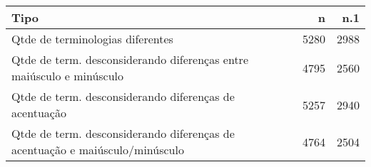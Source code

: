 \begin{table}[ht]
\centering
\begin{tabular}{lrr}
  \hline
Tipo & n & n.1 \\ 
  \hline
Qtde de terminologias diferentes & 5280 & 2988 \\ 
  Qtde de term. desconsiderando diferenças entre maiúsculo e minúsculo & 4795 & 2560 \\ 
  Qtde de term. desconsiderando diferenças de acentuação & 5257 & 2940 \\ 
  Qtde de term. desconsiderando diferenças de acentuação e
          maiúsculo/minúsculo & 4764 & 2504 \\ 
   \hline
\end{tabular}
\end{table}
